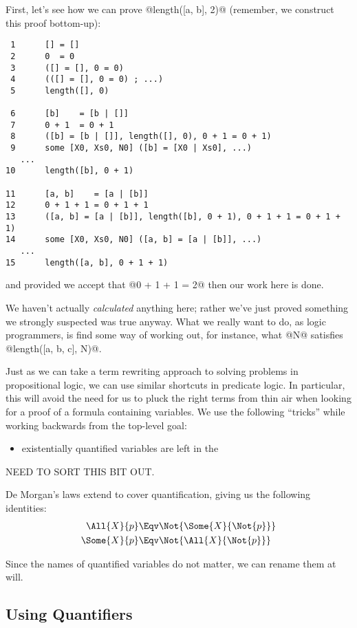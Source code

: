 First, let's see how we can prove @length([a, b], 2)@ (remember, we
construct this proof bottom-up):
\begin{verbatim}
 1      [] = []
 2      0  = 0
 3      ([] = [], 0 = 0)
 4      (([] = [], 0 = 0) ; ...)
 5      length([], 0)

 6      [b]    = [b | []]
 7      0 + 1  = 0 + 1
 8      ([b] = [b | []], length([], 0), 0 + 1 = 0 + 1)
 9      some [X0, Xs0, N0] ([b] = [X0 | Xs0], ...)
   ...
10      length([b], 0 + 1)

11      [a, b]    = [a | [b]]
12      0 + 1 + 1 = 0 + 1 + 1
13      ([a, b] = [a | [b]], length([b], 0 + 1), 0 + 1 + 1 = 0 + 1 + 1)
14      some [X0, Xs0, N0] ([a, b] = [a | [b]], ...)
   ...
15      length([a, b], 0 + 1 + 1)
\end{verbatim}
and provided we accept that @0 + 1 + 1 = 2@ then our work here is done.

We haven't actually \emph{calculated} anything here; rather we've just
proved something we strongly suspected was true anyway.  What we really
want to do, as logic programmers, is find some way of working out, for
instance, what @N@ satisfies @length([a, b, c], N)@.

Just as we can take a term rewriting approach to solving problems in
propositional logic, we can use similar shortcuts in predicate logic.
In particular, this will avoid the need for us to pluck the right terms
from thin air when looking for a proof of a formula containing variables.
We use the following ``tricks'' while working backwards from the
top-level goal:
\begin{itemize}
\item existentially quantified variables are left in the 
\end{itemize}
\XXX NEED TO SORT THIS BIT OUT.





De Morgan's laws extend to cover quantification, giving us the following
identities:
\begin{align*}
\All{X}{p}
& \Eqv \Not{\Some{X}{\Not{p}}} \\
\Some{X}{p}
& \Eqv \Not{\All{X}{\Not{p}}} \\
\end{align*}

Since the names of quantified variables do not matter, we can rename
them at will.

\subsection{Using Quantifiers}

